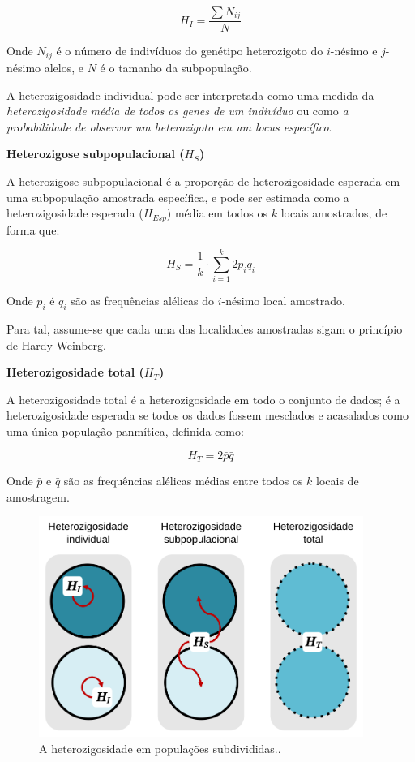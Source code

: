 \documentclass[
]{book}
\begin{document}
\[H_I = \frac{\sum{N_{ij}}}{N}\]

Onde
\(N_{ij}\) é o número de indivíduos do genétipo heterozigoto do \(i\)-nésimo e \(j\)-nésimo alelos, e
\(N\) é o tamanho da subpopulação.

A heterozigosidade individual pode ser interpretada como uma medida da \emph{heterozigosidade média de todos os genes de um indivíduo} ou como \emph{a probabilidade de observar um heterozigoto em um locus específico}.

\textbf{Heterozigose subpopulacional (\(H_S\))}

A heterozigose subpopulacional é a proporção de heterozigosidade esperada em uma subpopulação amostrada específica, e pode ser estimada como a heterozigosidade esperada (\(H_{Esp}\)) média em todos os \(k\) locais amostrados, de forma que:

\[H_S = \frac{1}{k}\cdot\sum_{i=1}^k{2p_iq_i}\]

Onde
\(p_i\) é \(q_i\) são as frequências alélicas do \(i\)-nésimo local amostrado.

Para tal, assume-se que cada uma das localidades amostradas sigam o princípio de Hardy-Weinberg.

\textbf{Heterozigosidade total (\(H_T\))}

A heterozigosidade total é a heterozigosidade em todo o conjunto de dados; é a heterozigosidade esperada se todos os dados fossem mesclados e acasalados como uma única população panmítica, definida como:

\[H_T = 2\bar{p}\bar{q}\]

Onde
\(\bar{p}\) e \(\bar{q}\) são as frequências alélicas médias entre todos os \(k\) locais de amostragem.

\begin{figure}

{\centering \includegraphics[width=400px]{figs/heterozigosity} 

}

\caption{A heterozigosidade em populações subdivididas..}\label{fig:hetrozigosedemography}
\end{figure}
\end{document}
